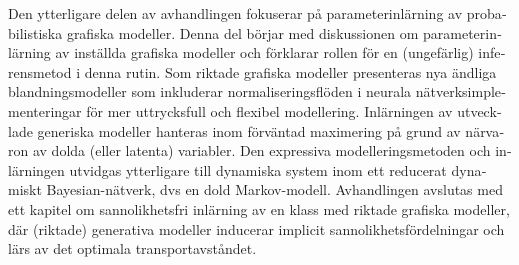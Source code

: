\begin{otherlanguage}{swedish}
  Den ytterligare delen av avhandlingen fokuserar på parameterinlärning av probabilistiska grafiska modeller. Denna del börjar med diskussionen om parameterinlärning av inställda grafiska modeller och förklarar rollen för en (ungefärlig) inferensmetod i denna rutin. Som riktade grafiska modeller presenteras nya ändliga blandningsmodeller som inkluderar normaliseringsflöden i neurala nätverksimplementeringar för mer uttrycksfull och flexibel modellering. Inlärningen av utvecklade generiska modeller hanteras inom förväntad maximering på grund av närvaron av dolda (eller latenta) variabler. Den expressiva modelleringsmetoden och inlärningen utvidgas ytterligare till dynamiska system inom ett reducerat dynamiskt Bayesian-nätverk, dvs en dold Markov-modell. Avhandlingen avslutas med ett kapitel om sannolikhetsfri inlärning av en klass med riktade grafiska modeller, där (riktade) generativa modeller inducerar implicit sannolikhetsfördelningar och lärs av det optimala transportavståndet.
\end{otherlanguage}

